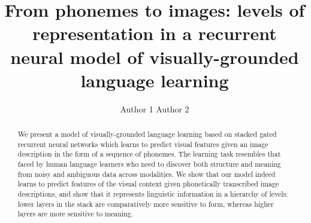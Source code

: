 \documentclass[11pt]{article}
\title{From phonemes to images: levels of representation in a recurrent neural
model of visually-grounded language learning}
\author{Author 1 \And Author 2}
\date{}
\begin{document}
\maketitle
\begin{abstract}
We present a model of visually-grounded language learning based on stacked gated recurrent neural networks which learns to predict visual features given an image description in the form of a sequence of phonemes. The learning task resembles that faced by human language learners who need to discover both structure and meaning from noisy and ambiguous data across modalities. We show that our model indeed learns to predict features of the visual context given phonetically transcribed image descriptions, and show that it represents linguistic information in a hierarchy of levels: lower layers in the stack are comparatively more sensitive to form, whereas higher layers are more sensitive to meaning.
\end{abstract}












\end{document}

